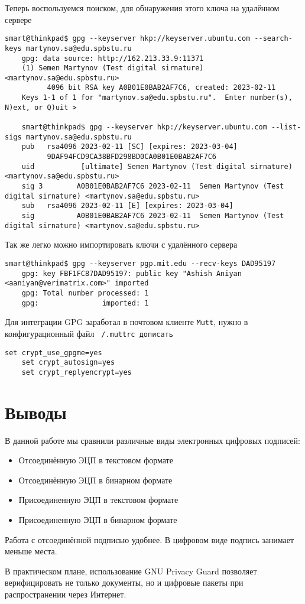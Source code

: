 Теперь воспользуемся поиском, для обнаружения этого ключа на удалённом сервере
\begin{Verbatim}[frame=single,breaklines=true,breakanywhere=true]
    smart@thinkpad$ gpg --keyserver hkp://keyserver.ubuntu.com --search-keys martynov.sa@edu.spbstu.ru
    gpg: data source: http://162.213.33.9:11371
    (1)	Semen Martynov (Test digital sirnature) <martynov.sa@edu.spbstu.ru>
    	  4096 bit RSA key A0B01E0BAB2AF7C6, created: 2023-02-11
    Keys 1-1 of 1 for "martynov.sa@edu.spbstu.ru".  Enter number(s), N)ext, or Q)uit >

    smart@thinkpad$ gpg --keyserver hkp://keyserver.ubuntu.com --list-sigs martynov.sa@edu.spbstu.ru
    pub   rsa4096 2023-02-11 [SC] [expires: 2023-03-04]
          9DAF94FCD9CA38BFD298BD0CA0B01E0BAB2AF7C6
    uid           [ultimate] Semen Martynov (Test digital sirnature) <martynov.sa@edu.spbstu.ru>
    sig 3        A0B01E0BAB2AF7C6 2023-02-11  Semen Martynov (Test digital sirnature) <martynov.sa@edu.spbstu.ru>
    sub   rsa4096 2023-02-11 [E] [expires: 2023-03-04]
    sig          A0B01E0BAB2AF7C6 2023-02-11  Semen Martynov (Test digital sirnature) <martynov.sa@edu.spbstu.ru>
\end{Verbatim}

Так же легко можно импортировать ключи с удалённого сервера
\begin{Verbatim}[frame=single,breaklines=true,breakanywhere=true]
    smart@thinkpad$ gpg --keyserver pgp.mit.edu --recv-keys DAD95197
    gpg: key FBF1FC87DAD95197: public key "Ashish Aniyan <aaniyan@verimatrix.com>" imported
    gpg: Total number processed: 1
    gpg:               imported: 1
\end{Verbatim}

Для интеграции GPG заработал в почтовом клиенте \texttt{Mutt}, нужно в конфигурационный файл \texttt{~/.muttrc дописать}
\begin{Verbatim}[frame=single,breaklines=true,breakanywhere=true]
    set crypt_use_gpgme=yes
    set crypt_autosign=yes
    set crypt_replyencrypt=yes
\end{Verbatim}

\section*{Выводы}

В данной работе мы сравнили различные виды электронных цифровых подписей:
\begin{itemize}
    \item Отсоединённую ЭЦП в текстовом формате
    \item Отсоединённую ЭЦП в бинарном формате
    \item Присоединенную ЭЦП в текстовом формате
    \item Присоединенную ЭЦП в бинарном формате
\end{itemize}

Работа с отсоединённой подписью удобнее. В цифровом виде подпись занимает меньше места.

В практическом плане, использование GNU Privacy Guard позволяет верифицировать не только документы, но и цифровые пакеты при распространении через Интернет.

